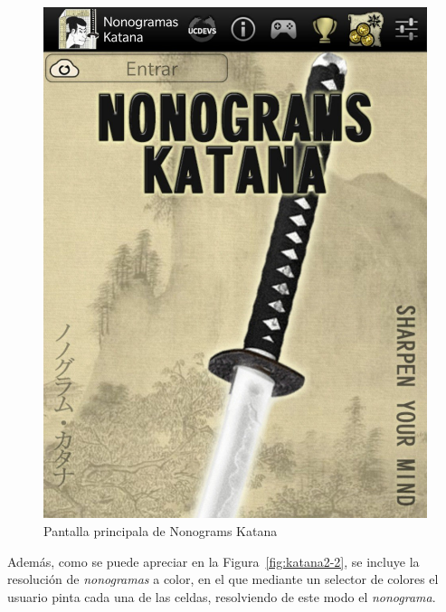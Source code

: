 \begin{figure}[H]
   \centering
   \includegraphics[scale=.15]{images/nonokatana1.jpg}
   \caption{Pantalla principala de Nonograms Katana}
   \label{fig:katana1}
 \end{figure}

 Además, como se puede apreciar en la Figura~\ref{fig:katana2-2}, se incluye la resolución de \textit{nonogramas} a color, en el que mediante un selector
 de colores el usuario pinta cada una de las celdas, resolviendo de este modo el \textit{nonograma}.

